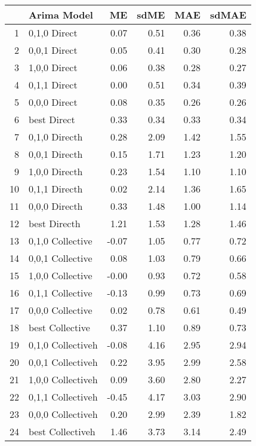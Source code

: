 \begin{table}[ht]
\centering
\begin{tabular}{rlrrrr}
  \hline
 & Arima Model & ME & sdME & MAE & sdMAE \\ 
  \hline
1 & 0,1,0 Direct & 0.07 & 0.51 & 0.36 & 0.38 \\ 
  2 & 0,0,1 Direct & 0.05 & 0.41 & 0.30 & 0.28 \\ 
  3 & 1,0,0 Direct & 0.06 & 0.38 & 0.28 & 0.27 \\ 
  4 & 0,1,1 Direct & 0.00 & 0.51 & 0.34 & 0.39 \\ 
  5 & 0,0,0 Direct & 0.08 & 0.35 & 0.26 & 0.26 \\ 
  6 & best Direct & 0.33 & 0.34 & 0.33 & 0.34 \\ 
  7 & 0,1,0 Directh & 0.28 & 2.09 & 1.42 & 1.55 \\ 
  8 & 0,0,1 Directh & 0.15 & 1.71 & 1.23 & 1.20 \\ 
  9 & 1,0,0 Directh & 0.23 & 1.54 & 1.10 & 1.10 \\ 
  10 & 0,1,1 Directh & 0.02 & 2.14 & 1.36 & 1.65 \\ 
  11 & 0,0,0 Directh & 0.33 & 1.48 & 1.00 & 1.14 \\ 
  12 & best Directh & 1.21 & 1.53 & 1.28 & 1.46 \\ 
  13 & 0,1,0 Collective & -0.07 & 1.05 & 0.77 & 0.72 \\ 
  14 & 0,0,1 Collective & 0.08 & 1.03 & 0.79 & 0.66 \\ 
  15 & 1,0,0 Collective & -0.00 & 0.93 & 0.72 & 0.58 \\ 
  16 & 0,1,1 Collective & -0.13 & 0.99 & 0.73 & 0.69 \\ 
  17 & 0,0,0 Collective & 0.02 & 0.78 & 0.61 & 0.49 \\ 
  18 & best Collective & 0.37 & 1.10 & 0.89 & 0.73 \\ 
  19 & 0,1,0 Collectiveh & -0.08 & 4.16 & 2.95 & 2.94 \\ 
  20 & 0,0,1 Collectiveh & 0.22 & 3.95 & 2.99 & 2.58 \\ 
  21 & 1,0,0 Collectiveh & 0.09 & 3.60 & 2.80 & 2.27 \\ 
  22 & 0,1,1 Collectiveh & -0.45 & 4.17 & 3.03 & 2.90 \\ 
  23 & 0,0,0 Collectiveh & 0.20 & 2.99 & 2.39 & 1.82 \\ 
  24 & best Collectiveh & 1.46 & 3.73 & 3.14 & 2.49 \\ 
   \hline
\end{tabular}
\end{table}
